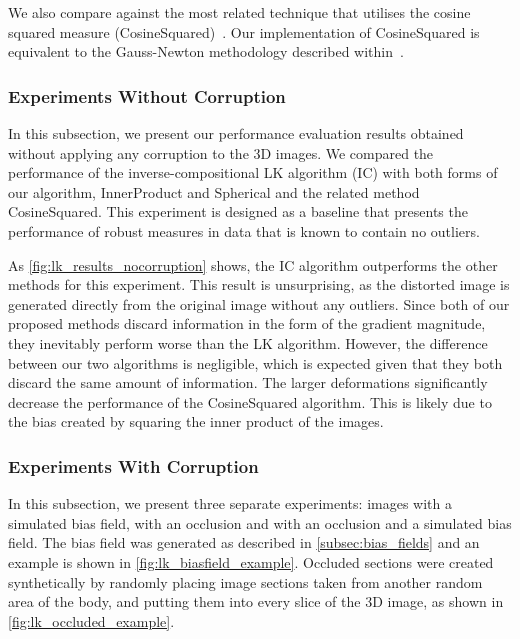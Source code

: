 We also compare against the most related technique that utilises the cosine
squared measure (CosineSquared)~\cite{haber2006intensity}. Our implementation of
CosineSquared is equivalent to the Gauss-Newton methodology described
within~\cite{haber2006intensity}.
\subsubsection{Experiments Without Corruption}\label{subsec:lk_results_nocorruption}
In this subsection, we present our performance evaluation results obtained
without applying any corruption to the 3D images. We compared the performance of
the inverse-compositional LK algorithm (IC) with both forms of our algorithm,
InnerProduct and Spherical and the related method CosineSquared. This experiment
is designed as a baseline that presents the performance of robust measures in
data that is known to contain no outliers.

As \cref{fig:lk_results_nocorruption} shows, the IC algorithm outperforms
the other methods for this experiment. This result is unsurprising, as the
distorted image is generated directly from the original image without any
outliers. Since both of our proposed methods discard information in the form of
the gradient magnitude, they inevitably perform worse than the LK algorithm.
However, the difference between our two algorithms is negligible, which is
expected given that they both discard the same amount of information. The larger
deformations significantly decrease the performance of the CosineSquared
algorithm. This is likely due to the bias created by squaring the inner product
of the images.
\subsubsection{Experiments With Corruption}\label{subsec:lk_results_corrupted}
In this subsection, we present three separate experiments: images with a
simulated bias field, with an occlusion and with an occlusion and a simulated
bias field. The bias field was generated as described in
\cref{subsec:bias_fields} and an example is shown in
\cref{fig:lk_biasfield_example}. Occluded sections were created
synthetically by randomly placing image sections taken from another random area
of the body, and putting them into every slice of the 3D image, as shown in
\cref{fig:lk_occluded_example}.

